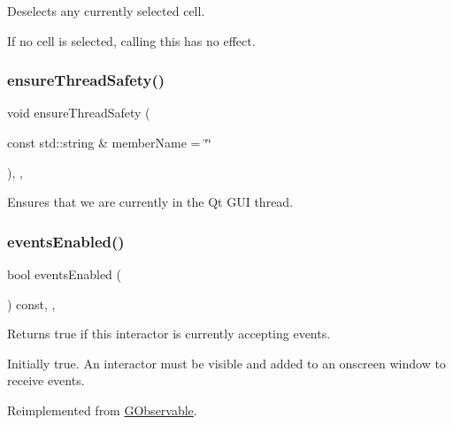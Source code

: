 Deselects any currently selected cell. 

If no cell is selected, calling this has no effect. \mbox{\label{classsgl_1_1GObservable_a284f31528c0520f8e545c03ac9eeac74}} 
\subsubsection{\texorpdfstring{ensure\+Thread\+Safety()}{ensureThreadSafety()}}
{\footnotesize\ttfamily void ensure\+Thread\+Safety (\begin{DoxyParamCaption}\item[{const std\+::string \&}]{member\+Name = {\ttfamily \char`\"{}\char`\"{}} }\end{DoxyParamCaption})\hspace{0.3cm}{\ttfamily [protected]}, {\ttfamily [virtual]}, {\ttfamily [inherited]}}



Ensures that we are currently in the Qt G\+UI thread. 

\mbox{\label{classsgl_1_1GInteractor_a597a370b592e3737d38d9d2f4e2031ea}} 
\subsubsection{\texorpdfstring{events\+Enabled()}{eventsEnabled()}}
{\footnotesize\ttfamily bool events\+Enabled (\begin{DoxyParamCaption}{ }\end{DoxyParamCaption}) const\hspace{0.3cm}{\ttfamily [override]}, {\ttfamily [virtual]}, {\ttfamily [inherited]}}



Returns true if this interactor is currently accepting events. 

Initially true. An interactor must be visible and added to an onscreen window to receive events. 

Reimplemented from \mbox{\hyperlink{classsgl_1_1GObservable_a8ebb3da91032e7f4c34485dabc518b8a}{G\+Observable}}.

